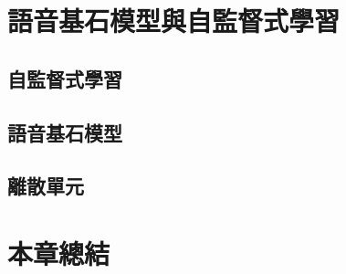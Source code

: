 \section{語音基石模型與自監督式學習}

\subsection{自監督式學習}

\subsection{語音基石模型}

\subsection{離散單元}


\section{本章總結}


